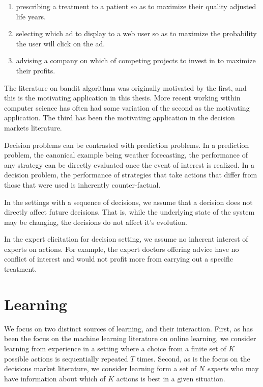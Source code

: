\begin{enumerate}
\item  prescribing a treatment to a patient so as to maximize their quality adjusted life years.
\item selecting which ad to display to a web user so as to maximize the probability the user will click on the ad. 
\item advising a company on which of competing projects to invest in to maximize their profits.
\end{enumerate}

The literature on bandit algorithms was originally motivated by the first, and this is the motivating application in this thesis. More recent working within computer science has often had some variation of the second as the motivating application. The third has been the motivating application in the decision markets literature. 

Decision problems can be contrasted with prediction problems.
In a prediction problem, the canonical example being weather forecasting, the performance of any strategy can be directly evaluated once the event of interest is realized.
In a decision problem, the performance of strategies that take actions that differ from those that were used is inherently counter-factual. 

In the settings with a sequence of decisions,  we assume that a decision does not directly affect  future decisions. That is, while the underlying state of the system may be changing, the decisions do not affect it's evolution.

In the expert elicitation for decision setting, we assume no inherent interest of experts on actions. For example, the expert doctors offering advice have no conflict of interest and would not profit more from carrying out a specific treatment.

\section{Learning}

We focus on two distinct sources of learning, and their interaction.
First, as has been the focus on the machine learning literature on online learning, we consider learning from experience in a setting where a choice from a finite set of $K$ possible actions is sequentially repeated $T$ times.
Second, as is the focus on the decisions market literature, we consider learning form a set of $N$ \emph{experts} who may have information about which of $K$ actions is best in a given situation.

